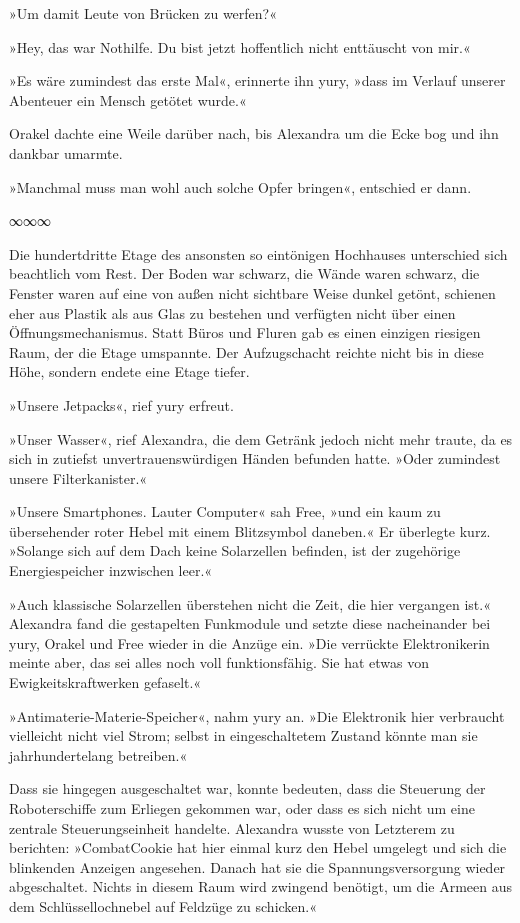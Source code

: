 »Um damit Leute von Brücken zu werfen?«

»Hey, das war Nothilfe. Du bist jetzt hoffentlich nicht enttäuscht von mir.«

»Es wäre zumindest das erste Mal«, erinnerte ihn yury, »dass im Verlauf unserer Abenteuer ein Mensch getötet wurde.«

Orakel dachte eine Weile darüber nach, bis Alexandra um die Ecke bog und ihn dankbar umarmte.

»Manchmal muss man wohl auch solche Opfer bringen«, entschied er dann.

\begin{center}
∞∞∞
\end{center}

Die hundertdritte Etage des ansonsten so eintönigen Hochhauses unterschied sich beachtlich vom Rest. Der Boden war schwarz, die Wände waren schwarz, die Fenster waren auf eine von außen nicht sichtbare Weise dunkel getönt, schienen eher aus Plastik als aus Glas zu bestehen und verfügten nicht über einen Öffnungsmechanismus. Statt Büros und Fluren gab es einen einzigen riesigen Raum, der die Etage umspannte. Der Aufzugschacht reichte nicht bis in diese Höhe, sondern endete eine Etage tiefer.

»Unsere Jetpacks«, rief yury erfreut.

»Unser Wasser«, rief Alexandra, die dem Getränk jedoch nicht mehr traute, da es sich in zutiefst unvertrauenswürdigen Händen befunden hatte. »Oder zumindest unsere Filterkanister.«

»Unsere Smartphones. Lauter Computer« sah Free, »und ein kaum zu übersehender roter Hebel mit einem Blitzsymbol daneben.« Er überlegte kurz. »Solange sich auf dem Dach keine Solarzellen befinden, ist der zugehörige Energiespeicher inzwischen leer.«

»Auch klassische Solarzellen überstehen nicht die Zeit, die hier vergangen ist.« Alexandra fand die gestapelten Funkmodule und setzte diese nacheinander bei yury, Orakel und Free wieder in die Anzüge ein. »Die verrückte Elektronikerin meinte aber, das sei alles noch voll funktionsfähig. Sie hat etwas von Ewigkeitskraftwerken gefaselt.«

»Antimaterie-Materie-Speicher«, nahm yury an. »Die Elektronik hier verbraucht vielleicht nicht viel Strom; selbst in eingeschaltetem Zustand könnte man sie jahrhundertelang betreiben.«

Dass sie hingegen ausgeschaltet war, konnte bedeuten, dass die Steuerung der Roboterschiffe zum Erliegen gekommen war, oder dass es sich nicht um eine zentrale Steuerungseinheit handelte. Alexandra wusste von Letzterem zu berichten: »CombatCookie hat hier einmal kurz den Hebel umgelegt und sich die blinkenden Anzeigen angesehen. Danach hat sie die Spannungsversorgung wieder abgeschaltet. Nichts in diesem Raum wird zwingend benötigt, um die Armeen aus dem Schlüssellochnebel auf Feldzüge zu schicken.«

